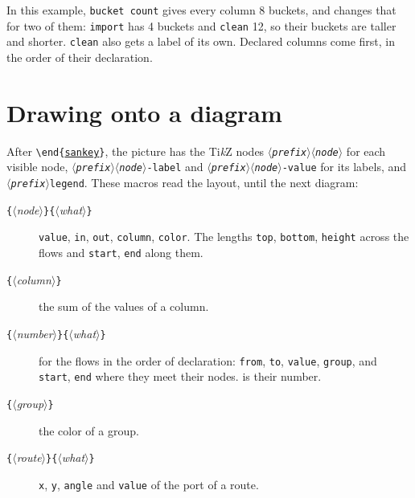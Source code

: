 \documentclass[10pt,parskip=half,english,numbers=noenddot,footnotes=nomultiple,oneside]{scrartcl}
\let\T\texttt
\newcommand\meta[1]{\ensuremath{\langle}\textit{#1}\ensuremath{\rangle}}
\newcommand\marg[1]{\T{\{}\meta{#1}\T{\}}}
\newcommand\envref[1]{\hyperref[env:#1]{\T{\color{skenv}#1}}}
\begin{document}
In this example, \T{bucket count} gives every column 8 buckets, and  changes that for two of them: \T{import} has 4 buckets and \T{clean} 12, so their buckets are taller and shorter. \T{clean} also gets a label of its own. Declared columns come first, in the order of their declaration.
\begin{example}
\begin{sankeypicture}[bucket bars,
   height=36mm, bucket count=8]
\end{sankeypicture}
\end{example}

\section{Drawing onto a diagram}\label{sec:annotate}
After \T{\textbackslash end\{}\envref{sankey}\T{\}}, the picture has the Ti\emph{k}Z nodes \T{\meta{prefix}\meta{node}} for each visible node, \T{\meta{prefix}\meta{node}-label} and \T{\meta{prefix}\meta{node}-value} for its labels, and \T{\meta{prefix}legend}. These macros read the layout, until the next diagram:
\begin{description}
\item[\label{info:node}\marg{node}\marg{what}] \T{value}, \T{in}, \T{out}, \T{column}, \T{color}. The lengths \T{top}, \T{bottom}, \T{height} across the flows and \T{start}, \T{end} along them.
\item[\marg{column}] the sum of the values of a column.
\item[\marg{number}\marg{what}] for the flows in the order of declaration: \T{from}, \T{to}, \T{value}, \T{group}, and \T{start}, \T{end} where they meet their nodes.  is their number.
\item[\marg{group}] the color of a group.
\item[\marg{route}\marg{what}] \T{x}, \T{y}, \T{angle} and \T{value} of the port of a route.
\end{description}
\begin{example}
\end{example}
\end{document}
